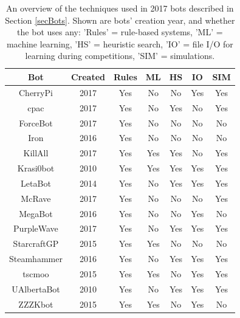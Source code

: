 
\begin{table}[t] 
 
 \begin{center}
 \begin{tabular} {| c | c | c | c | c | c | c |}
 \hline
 \textbf{Bot} & \textbf{Created} & \textbf{Rules} & \textbf{ML} & \textbf{HS} & \textbf{IO} & \textbf{SIM}\\
 \hline
 CherryPi & 2017 & Yes & No & No & Yes & Yes\\
 \hline
 cpac & 2017 & Yes & No & Yes & No & Yes\\
 \hline
	ForceBot & 2017 & Yes & No & No & No & No\\
 \hline
Iron & 2016 & Yes & No & No & No & No\\
 \hline
KillAll & 2017 & Yes & Yes & Yes & No & Yes\\
 \hline
Krasi0bot & 2010 & Yes & Yes & Yes & Yes & Yes\\
 \hline
LetaBot & 2014 & Yes & No & Yes & Yes & Yes\\
 \hline
McRave & 2017 & Yes & No & No & No & Yes\\
 \hline
MegaBot & 2016 & Yes & No & No & Yes & No\\
 \hline
PurpleWave & 2017 & Yes & No & Yes & Yes & Yes\\
 \hline
StarcraftGP & 2015 & Yes & Yes & No & No & No\\
 \hline
Steamhammer & 2016 & Yes & No & Yes & Yes & Yes\\
 \hline
tscmoo & 2015 & Yes & Yes & No & Yes & Yes\\
 \hline
 UAlbertaBot & 2010 & Yes & No & Yes & Yes & Yes\\
 \hline
 ZZZKbot & 2015 & Yes & Yes & No & Yes & No\\
 \hline
 \end{tabular}
 \end{center}  
 \caption{An overview of the techniques used in 2017 bots described in Section \ref{secBots}. Shown are bots' creation year, and whether the bot uses any: 'Rules' = rule-based systems, 'ML' = machine learning, 'HS' = heuristic search, 'IO' = file I/O for learning during competitions, 'SIM' = simulations. }
 \label{tableBots}
\end{table} 


